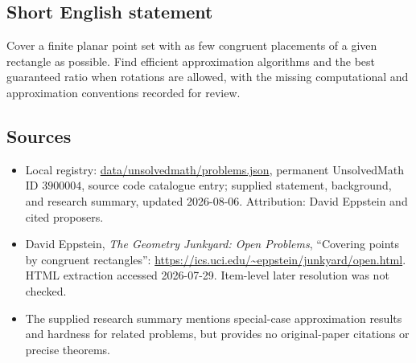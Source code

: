 \documentclass[11pt]{article}
\begin{document}
\subsection{Short English statement}
Cover a finite planar point set with as few congruent placements of a given rectangle as possible. Find efficient approximation algorithms and the best guaranteed ratio when rotations are allowed, with the missing computational and approximation conventions recorded for review.
\subsection{Sources}
\begin{itemize}
\item Local registry: \url{data/unsolvedmath/problems.json}, permanent UnsolvedMath ID \(3900004\), source code catalogue entry; supplied statement, background, and research summary, updated 2026-08-06. Attribution: David Eppstein and cited proposers.
\item David Eppstein, \emph{The Geometry Junkyard: Open Problems}, ``Covering points by congruent rectangles'': \url{https://ics.uci.edu/~eppstein/junkyard/open.html}. HTML extraction accessed 2026-07-29. Item-level later resolution was not checked.
\item The supplied research summary mentions special-case approximation results and hardness for related problems, but provides no original-paper citations or precise theorems.
\end{itemize}
\end{document}

